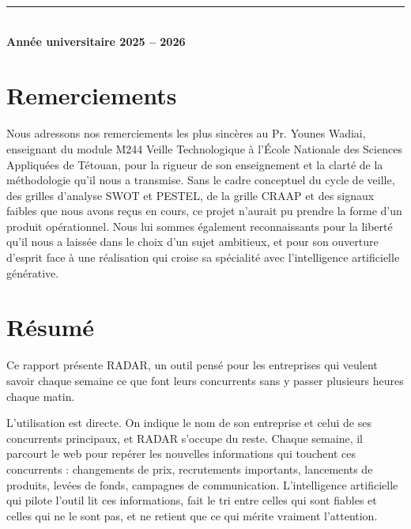 \documentclass[12pt,a4paper,openany]{report}
\begin{document}
\begin{titlepage}
  \vspace{1cm}

  {\color{ensaBlueLight}\rule{0.4\linewidth}{0.4pt}}\\[8pt]
  {\sffamily\large\color{ensaBlue}\textbf{Année universitaire 2025 -- 2026}}

\end{titlepage}

\chapter*{Remerciements}
\thispagestyle{empty}

\vspace{2cm}

Nous adressons nos remerciements les plus sincères au Pr. Younes Wadiai, enseignant du module M244 Veille Technologique à l'École Nationale des Sciences Appliquées de Tétouan, pour la rigueur de son enseignement et la clarté de la méthodologie qu'il nous a transmise. Sans le cadre conceptuel du cycle de veille, des grilles d'analyse SWOT et PESTEL, de la grille CRAAP et des signaux faibles que nous avons reçus en cours, ce projet n'aurait pu prendre la forme d'un produit opérationnel. Nous lui sommes également reconnaissants pour la liberté qu'il nous a laissée dans le choix d'un sujet ambitieux, et pour son ouverture d'esprit face à une réalisation qui croise sa spécialité avec l'intelligence artificielle générative.

\vfill

\chapter*{Résumé}

Ce rapport présente RADAR, un outil pensé pour les entreprises qui veulent savoir chaque semaine ce que font leurs concurrents sans y passer plusieurs heures chaque matin.

L'utilisation est directe. On indique le nom de son entreprise et celui de ses concurrents principaux, et RADAR s'occupe du reste. Chaque semaine, il parcourt le web pour repérer les nouvelles informations qui touchent ces concurrents : changements de prix, recrutements importants, lancements de produits, levées de fonds, campagnes de communication. L'intelligence artificielle qui pilote l'outil lit ces informations, fait le tri entre celles qui sont fiables et celles qui ne le sont pas, et ne retient que ce qui mérite vraiment l'attention.
\end{document}

